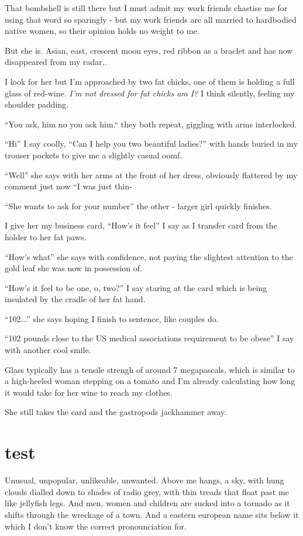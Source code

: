 \documentclass[19pt,openany]{book}
\begin{document}
That bombshell is still there but
I must admit my work friends
chastise me for using that
word so sparingly - but
my work friends are all married
to hardbodied native women, so
their opinion holds no weight
to me.

But she is.
Asian, east, crescent moon eyes,
red ribbon as a braclet and has now disappeared from
my radar..

I look for her but
I'm approached by two fat chicks, one of them is holding a full glass
of red-wine.
 \textit{I'm not
dressed for fat chicks am I?} I
think silently, feeling my shoulder
padding.

``You ask, him no you ask him.``
they both repeat, giggling with
arms interlocked.

``Hi'' I say coolly, ``Can I help
you two beautiful ladies?'' with
hands buried in my trouser
pockets to give me a slightly casual
oomf.

``Well'' she says with her
arms at the front of her
dress,
obviously flattered
by my comment just now
``I was just thin-

``She wants to ask for
your number'' the other -
larger girl quickly finishes.

I give her my business card,
``How's it feel'' I say
as I transfer card from the
holder to her fat paws.

``How's what'' she says with
confidence, not paying
the slightest attention
to the gold leaf
she was now in possession of.

``How's it feel to be one,
o, two?'' I say staring
at the card which is being
insulated by the cradle of her fat
hand.

``102...'' she says hoping
I finish to sentence, like
couples do.

``102 pounds close
to the US medical associations
requirement to be obese'' I say
with another cool smile.

Glass typically
has a tensile
strengh of around
7 megapascals, which is
similar to a high-heeled
woman stepping on a tomato
and I'm already calculating
how long it would take for her
wine to reach my clothes.

She still takes the card and
the gastropods jackhammer away.


\newpage
\chapter{test}
Unusual, unpopular, unlikeable,
unwanted. Above me hangs,
a sky, with hung clouds dialled
down to shades of radio grey,
with thin treads that float past
me like jellyfish legs. And men, women
and children are sucked into a tornado
as it shifts through the wreckage of a town.
And a eastern european name sits below it
which I don't know the correct pronounciation
for.
\end{document}
